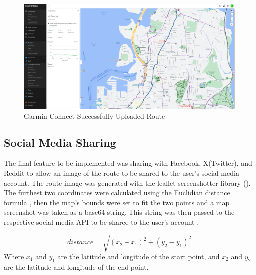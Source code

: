 \label{fig:garmin-connect}
\begin{figure}[!ht]
  \centering
  \includegraphics[width=425px]{figures/Progress Images/Iteration-3/SR50/SR50 - Garmin Connect App Course Viewer.png}
  \caption{Garmin Connect Successfully Uploaded Route}
\end{figure}

\subsection{Social Media Sharing}
\label{iteration3:social-sharing}

The final feature to be implemented was sharing with Facebook, X(Twitter), and Reddit to allow an image of the route to be shared to the user's social media account. The route image was generated with the leaflet screenshotter library (\cite{noauthor_leaflet-simple-map-screenshoter_2022}). The furthest two coordinates were calculated using the Euclidian distance formula , then the map's bounds were set to fit the two points and a map screenshot was taken as a base64 string. This string was then passed to the respective social media API to be shared to the user's account .

\begin{equation}
  \label{iteration3:euclidian-distance}
  distance = \sqrt{(x_2 - x_1)^2 + (y_2 - y_1)^2}
\end{equation}
Where $x_1$ and $y_1$ are the latitude and longitude of the start point, and $x_2$ and $y_2$ are the latitude and longitude of the end point.

